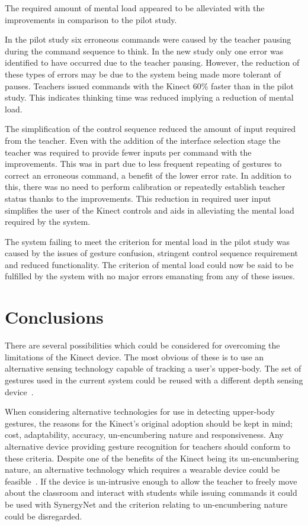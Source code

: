 \documentclass[link]{IWCOMP}
\begin{document}
The required amount of mental load appeared to be alleviated with the improvements in comparison to the pilot study.

In the pilot study six erroneous commands were caused by the teacher pausing during the command sequence to think.
In the new study only one error was identified to have occurred due to the teacher pausing.
However, the reduction of these types of errors may be due to the system being made more tolerant of pauses.
Teachers issued commands with the Kinect 60\% faster than in the pilot study.
This indicates thinking time was reduced implying a reduction of mental load.

The simplification of the control sequence reduced the amount of input required from the teacher.
Even with the addition of the interface selection stage the teacher was required to provide fewer inputs per command with the improvements.
This was in part due to less frequent repeating of gestures to correct an erroneous command, a benefit of the lower error rate.
In addition to this, there was no need to perform calibration or repeatedly establish teacher status thanks to the improvements.
This reduction in required user input simplifies the user of the Kinect controls and aids in alleviating the mental load required by the system.

The system failing to meet the criterion for mental load in the pilot study was caused by the issues of gesture confusion, stringent control sequence requirement and reduced functionality.
The criterion of mental load could now be said to be fulfilled by the system with no major errors emanating from any of these issues.

\section{Conclusions}
\label{sec:conclusions}



There are several possibilities which could be considered for overcoming the limitations of the Kinect device.
The most obvious of these is to use an alternative sensing technology capable of tracking a user's upper-body.
The set of gestures used in the current system could be reused with a different depth sensing device~\cite{Kean2011}.

When considering alternative technologies for use in detecting upper-body gestures, the reasons for the Kinect's original adoption should be kept in mind; cost, adaptability, accuracy, un-encumbering nature and responsiveness.
Any alternative device providing gesture recognition for teachers should conform to these criteria.
Despite one of the benefits of the Kinect being its un-encumbering nature, an alternative technology which requires a wearable device could be feasible~\cite{Rekimotoa,Zhu2011}.
If the device is un-intrusive enough to allow the teacher to freely move about the classroom and interact with students while issuing commands it could be used with SynergyNet and the criterion relating to un-encumbering nature could be disregarded. 
\end{document}

